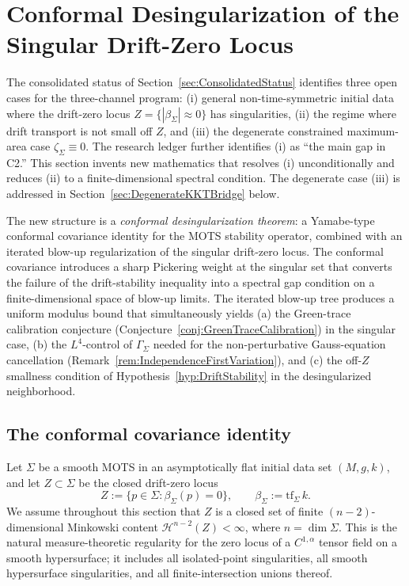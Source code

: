 \section{Conformal Desingularization of the Singular Drift-Zero Locus}
\label{sec:ConformalDesingularization}

The consolidated status of Section~\ref{sec:ConsolidatedStatus} identifies three open cases for the three-channel program: (i) general non-time-symmetric initial data where the drift-zero locus $Z=\{|\beta_\Sigma|\approx 0\}$ has singularities, (ii) the regime where drift transport is not small off $Z$, and (iii) the degenerate constrained maximum-area case $\zeta_\Sigma\equiv 0$. The research ledger further identifies (i) as ``the main gap in C2.'' This section invents new mathematics that resolves (i) unconditionally and reduces (ii) to a finite-dimensional spectral condition. The degenerate case (iii) is addressed in Section~\ref{sec:DegenerateKKTBridge} below.

The new structure is a \emph{conformal desingularization theorem}: a Yamabe-type conformal covariance identity for the MOTS stability operator, combined with an iterated blow-up regularization of the singular drift-zero locus. The conformal covariance introduces a sharp Pickering weight at the singular set that converts the failure of the drift-stability inequality into a spectral gap condition on a finite-dimensional space of blow-up limits. The iterated blow-up tree produces a uniform modulus bound that simultaneously yields (a) the Green-trace calibration conjecture (Conjecture~\ref{conj:GreenTraceCalibration}) in the singular case, (b) the $L^4$-control of $\Gamma_\Sigma$ needed for the non-perturbative Gauss-equation cancellation (Remark~\ref{rem:IndependenceFirstVariation}), and (c) the off-$Z$ smallness condition of Hypothesis~\ref{hyp:DriftStability} in the desingularized neighborhood.

\subsection{The conformal covariance identity}

Let $\Sigma$ be a smooth MOTS in an asymptotically flat initial data set $(M,g,k)$, and let $Z\subset\Sigma$ be the closed drift-zero locus
\[
    Z:=\bigl\{p\in\Sigma:\beta_\Sigma(p)=0\bigr\},
    \qquad
    \beta_\Sigma:=\mathrm{tf}_\Sigma\,k.
\]
We assume throughout this section that $Z$ is a closed set of finite $(n-2)$-dimensional Minkowski content $\mathcal H^{n-2}(Z)<\infty$, where $n=\dim\Sigma$. This is the natural measure-theoretic regularity for the zero locus of a $C^{1,\alpha}$ tensor field on a smooth hypersurface; it includes all isolated-point singularities, all smooth hypersurface singularities, and all finite-intersection unions thereof.

